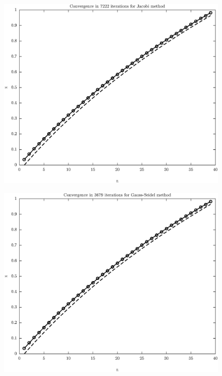 \documentclass[11pt]{article}
\begin{document}
\begin{figure}
\centering
\begin{minipage}{.45\textwidth}
\centering
\includegraphics[width=\linewidth]{math609_pa2_comp_example_1_n_39_k_Jacobi_part_a.eps}
\label{fig:test1}
\end{minipage}\hfill
\begin{minipage}{.45\textwidth}
\centering
\includegraphics[width=\linewidth]{math609_pa2_comp_example_1_n_39_k_Gauss-Seidel_part_a.eps}

\end{minipage}
\end{figure}
\end{document}
